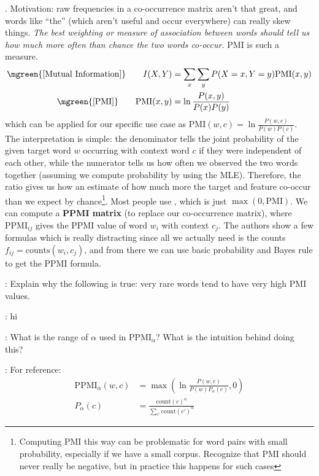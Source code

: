 \documentclass[11pt]{article}
\newcommand\myspace[1][]{\vspace{#1\bigskipamount}}
\newcommand\p{\Needspace{10\baselineskip} \noindent}
\newcommand\QA[2]{\item \red{Q}: #1
	\begin{compactitem}
		\item \green{A}: #2
	\end{compactitem}}
\begin{document}
\myspace
\p {}. Motivation: raw frequencies in a co-occurrence matrix aren't that great, and words like ``the'' (which aren't useful and occur everywhere) can really skew things. \textit{The best weighting or measure of association between words should tell us how much more often than chance the two words co-occur.} PMI is such a measure.
\begin{align}
\mgreen{\text{[Mutual Information]}} \qquad I(X, Y) &= \sum_x \sum_y P(X = x, Y = y) \mathrm{PMI}(x, y)  \\
\mgreen{\text{[PMI]}} \qquad \mathrm{PMI}(x, y) &= \ln \frac{P(x, y)}{P(x) P(y)}
\end{align}
which can be applied for our specific use case as $\mathrm{PMI}(w, c) = \ln \frac{P(w, c)}{P(w) P(c)}$. The interpretation is simple: the denominator tells the joint probability of the given target word $w$ occurring with context word $c$ if they were independent of each other, while the numerator tells us how often we observed the two words together (assuming we compute probability by using the MLE). Therefore, the ratio gives us how an estimate of how much more the target and feature co-occur than we expect by chance\footnote{Computing PMI this way can be problematic for word pairs with small probability, especially if we have a small corpus. Recognize that PMI should never really be negative, but in practice this happens for such cases}. Most people use , which is just $\max(0, \mathrm{PMI})$. We can compute a \textbf{PPMI matrix} (to replace our co-occurrence matrix), where $\mathrm{PPMI}_{ij}$ gives the PPMI value of word $w_i$ with context $c_j$. The authors show a few formulas which is really distracting since all we actually need is the counts $f_{ij} = \text{counts}(w_i, c_j)$, and from there we can use basic probability and Bayes rule to get the PPMI formula.
\begin{compactitem}
	\QA{Explain why the following is true: very rare words tend to have very high PMI values.}{hi}
	
	\QA{What is the range of $\alpha$ used in PPMI$_\alpha$? What is the intuition behind doing this?}{
		For reference:
		\begin{align}
			\mathrm{PPMI}_{\alpha}(w, c) &= \max\left(\ln \frac{P(w, c)}{P(w) P_\alpha(c)}, 0\right) \\
			 P_\alpha(c) &= \frac{ \text{count}(c)^{\alpha}}{ \sum_{c'} \text{count}(c')^{\alpha} }
		\end{align}
		}
\end{compactitem}
\vspace{1em}
\end{document}
